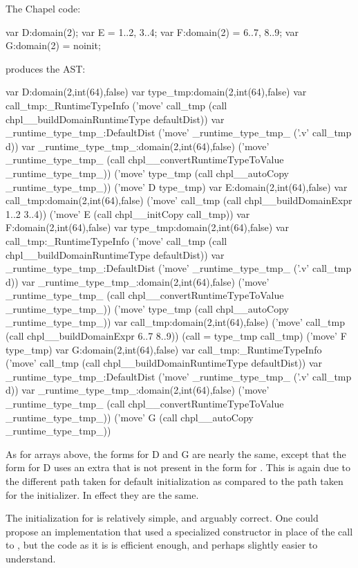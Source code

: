 The Chapel code:
\begin{chapel}
  var D:domain(2);
  var E = {1..2, 3..4};
  var F:domain(2) = {6..7, 8..9};
  var G:domain(2) = noinit;
\end{chapel}
produces the AST:
\begin{numberedchapel}
    var D:domain(2,int(64),false)
    {
      var type_tmp:domain(2,int(64),false)
      var call_tmp:_RuntimeTypeInfo
      ('move' call_tmp (call chpl__buildDomainRuntimeType defaultDist))
      var _runtime_type_tmp_:DefaultDist
      ('move' _runtime_type_tmp_ ('.v' call_tmp d))
      var _runtime_type_tmp_:domain(2,int(64),false)
      ('move' _runtime_type_tmp_ (call chpl__convertRuntimeTypeToValue _runtime_type_tmp_))
      ('move' type_tmp (call chpl__autoCopy _runtime_type_tmp_))
      ('move' D type_tmp)
    }
    var E:domain(2,int(64),false)
    var call_tmp:domain(2,int(64),false)
    ('move' call_tmp (call chpl__buildDomainExpr 1..2 3..4))
    ('move' E (call chpl__initCopy call_tmp))
    var F:domain(2,int(64),false)
    {
      var type_tmp:domain(2,int(64),false)
      var call_tmp:_RuntimeTypeInfo
      ('move' call_tmp (call chpl__buildDomainRuntimeType defaultDist))
      var _runtime_type_tmp_:DefaultDist
      ('move' _runtime_type_tmp_ ('.v' call_tmp d))
      var _runtime_type_tmp_:domain(2,int(64),false)
      ('move' _runtime_type_tmp_ (call chpl__convertRuntimeTypeToValue _runtime_type_tmp_))
      ('move' type_tmp (call chpl__autoCopy _runtime_type_tmp_))
      var call_tmp:domain(2,int(64),false)
      ('move' call_tmp (call chpl__buildDomainExpr 6..7 8..9))
      (call = type_tmp call_tmp)
      ('move' F type_tmp)
    }
    var G:domain(2,int(64),false)
    var call_tmp:_RuntimeTypeInfo
    ('move' call_tmp (call chpl__buildDomainRuntimeType defaultDist))
    var _runtime_type_tmp_:DefaultDist
    ('move' _runtime_type_tmp_ ('.v' call_tmp d))
    var _runtime_type_tmp_:domain(2,int(64),false)
    ('move' _runtime_type_tmp_ (call chpl__convertRuntimeTypeToValue _runtime_type_tmp_))
    ('move' G (call chpl__autoCopy _runtime_type_tmp_))
\end{numberedchapel}

As for arrays above, the forms for D and G are nearly the same, except that the form for D
uses an extra  that is not present in the form for .  This is again
due to the different path taken for default initialization as compared to the path taken
for the  initializer.  In effect they are the same.

The initialization for  is relatively simple, and arguably correct.  One could
propose an implementation that used a specialized constructor in place of the call to
, but the code as it is is efficient enough, and perhaps
slightly easier to understand.

